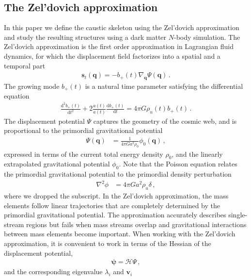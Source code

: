 \documentclass[a4paper, 11pt]{article}
\begin{document}
\subsection{The Zel'dovich approximation}
In this paper we define the caustic skeleton using the Zel'dovich approximation and study the resulting structures using a dark matter $N$-body simulation. The Zel'dovich approximation is the first order approximation in Lagrangian fluid dynamics, for which the displacement field factorizes into a spatial and a temporal part
\begin{align}
\bm{s}_t(\bm{q}) = - b_+(t) \nabla_{\bm{q}} \Psi(\bm{q})\,.
\end{align}
The growing mode $b_+(t)$ is a natural time parameter satisfying the differential equation
\begin{align}
\frac{\mathrm{d}^2 b_+(t)}{\mathrm{d}t^2} + 2 \frac{\dot{a}(t)}{a(t)} \frac{\mathrm{d} b_+(t)}{\mathrm{d}t} = 4 \pi G \rho_u(t) b_+(t)\,.
\end{align}
The displacement potential $\Psi$ captures the geometry of the cosmic web, and is proportional to the primordial gravitational potential
\begin{align}
\Psi(\bm{q}) &=\frac{1}{4 \pi G a^2 \rho_0}\phi_0(\bm{q})%
\,,
\end{align}
expressed in terms of the current total energy density %
$\rho_0$,
and the linearly extrapolated gravitational potential $\phi_0$. Note that the Poisson equation relates the primordial gravitational potential to the primordial density perturbation
\begin{align}
\nabla ^2 \phi &= 4 \pi G a^2 \rho_u \delta\,,%
\end{align}
where we dropped the subscript. In the Zel'dovich approximation, the mass elements follow linear trajectories that are completely determined by the primordial gravitational potential. The approximation accurately describes single-stream regions but fails when mass streams overlap and gravitational interactions between mass elements become important. When working with the Zel'dovich approximation, it is convenient to work in terms of the Hessian of the displacement potential,
\begin{align}
\bm{\psi}=\mathcal{H}\Psi\,,
\end{align}
and the corresponding eigenvalue $\lambda_i$ and $\bm{v}_i$
\end{document}
